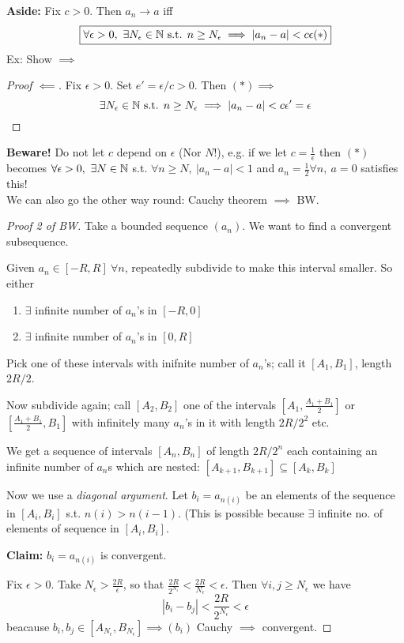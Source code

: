 \textbf{Aside:} Fix $c >0$. Then $a_n \to a$ iff 
\[\boxed{\forall \epsilon >0,~\exists N_{\epsilon} \in\mathbb{N} \text{ s.t. } n \geq N_\epsilon \implies |a_n - a| < c\epsilon (*)}\]
Ex: Show $\implies$

\begin{proof}[Proof $\impliedby$] Fix $\epsilon >0$. Set $e' = \epsilon/c >0$. Then $(*) \implies $
\[\exists N_\epsilon \in\mathbb{N} \text{ s.t. } n \geq N_\epsilon \implies |a_n - a| < c\epsilon' = \epsilon\qedhere\]
\end{proof}

\textbf{Beware!} Do not let $c$ depend on $\epsilon$ (Nor $N!$), e.g. if we let $c = \frac{1}{\epsilon}$ then $(*)$ becomes $\forall \epsilon >0,~\exists N \in\mathbb{N}$ s.t. $\forall n \geq N,~|a_n - a| < 1$ and $a_n = \frac{1}{2} \forall n,~ a = 0$ satisfies this!\\

We can also go the other way round: Cauchy theorem $\implies$ BW. 

\begin{proof}[Proof 2 of BW]



Take a bounded sequence $(a_n)$. We want to find a convergent subsequence. 

Given $a_n \in [-R,R]~ \forall n$, repeatedly subdivide to make this interval smaller. So either
\begin{enumerate}
\item $\exists$ infinite number of $a_n$'s in $[-R,0]$
\item $\exists$ infinite number of $a_n$'s in $[0,R]$
\end{enumerate}

Pick one of these intervals with inifnite number of $a_n$'s; call it $[A_1,B_1]$, length $2R/2$. 

Now subdivide again; call $[A_2,B_2]$ one of the intervals $[A_1,\frac{A_1+B_1}{2}]$ or $[\frac{A_1+B_1}{2},B_1]$ with infinitely many $a_n$'s in it with length $2R/2^2$ etc. 

We get a sequence of intervals $[A_n,B_n]$ of length $2R/2^n$ each containing an infinite number of $a_n$s which are nested: $[A_{k+1},B_{k+1}] \subseteq [A_k,B_k]$


Now we use a \emph{diagonal argument}. Let $b_i = a_{n(i)}$ be an elements of the sequence in $[A_i,B_i]$ s.t. $n(i) > n(i-1)$. (This is possible because $\exists$ infinite no. of elements of sequence in $[A_i,B_i]$. 

 \textbf{Claim:} $b_i = a_{n(i)}$ is convergent.

Fix $\epsilon >0$. Take $N_{\epsilon} > \frac{2R}{\epsilon}$, so that $\frac{2R}{2^{N_{\epsilon}}} < \frac{2R}{N_{\epsilon}} < \epsilon$. Then $\forall i, j \geq N_{\epsilon}$ we have
\[|b_i - b_j| < \frac{2R}{2^{N_{\epsilon}}} < \epsilon\]
beacause $b_i,b_j \in [A_{N_{\epsilon}},B_{N_{\epsilon}}] \implies (b_i)$ Cauchy $\implies$ convergent.
	\end{proof}\vspace*{5pt}
	

